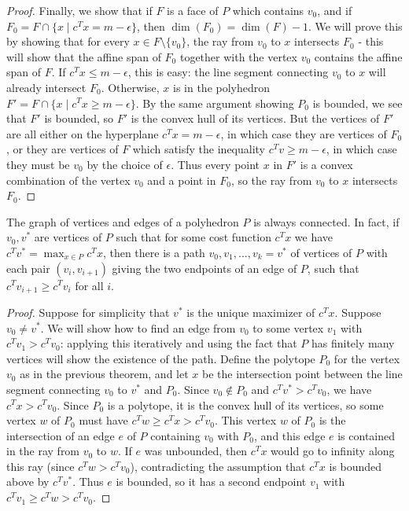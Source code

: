 \documentclass[12pt]{article}
\begin{document}
\begin{proof}
Finally, we show that if $F$ is a face of $P$ which contains $v_0$, and if $F_0 = F \cap \{x \mid c^Tx = m-\epsilon\}$, then $\dim(F_0) = \dim(F) - 1$. We will prove this by showing that for every $x \in F \setminus \{v_0\}$, the ray from $v_0$ to $x$ intersects $F_0$ - this will show that the affine span of $F_0$ together with the vertex $v_0$ contains the affine span of $F$. If $c^Tx \le m-\epsilon$, this is easy: the line segment connecting $v_0$ to $x$ will already intersect $F_0$. Otherwise, $x$ is in the polyhedron $F' = F \cap \{x \mid c^Tx \ge m-\epsilon\}$. By the same argument showing $P_0$ is bounded, we see that $F'$ is bounded, so $F'$ is the convex hull of its vertices. But the vertices of $F'$ are all either on the hyperplane $c^Tx = m-\epsilon$, in which case they are vertices of $F_0$, or they are vertices of $F$ which satisfy the inequality $c^Tv \ge m-\epsilon$, in which case they must be $v_0$ by the choice of $\epsilon$. Thus every point $x$ in $F'$ is a convex combination of the vertex $v_0$ and a point in $F_0$, so the ray from $v_0$ to $x$ intersects $F_0$.
\end{proof}

\begin{corollary} The graph of vertices and edges of a polyhedron $P$ is always connected. In fact, if $v_0, v^*$ are vertices of $P$ such that for some cost function $c^Tx$ we have $c^Tv^* = \max_{x \in P} c^Tx$, then there is a path $v_0, v_1, ..., v_k = v^*$ of vertices of $P$ with each pair $(v_i, v_{i+1})$ giving the two endpoints of an edge of $P$, such that $c^Tv_{i+1} \ge c^Tv_i$ for all $i$.
\end{corollary}
\begin{proof} Suppose for simplicity that $v^*$ is the unique maximizer of $c^Tx$. Suppose $v_0 \ne v^*$. We will show how to find an edge from $v_0$ to some vertex $v_1$ with $c^Tv_1 > c^Tv_0$: applying this iteratively and using the fact that $P$ has finitely many vertices will show the existence of the path. Define the polytope $P_0$ for the vertex $v_0$ as in the previous theorem, and let $x$ be the intersection point between the line segment connecting $v_0$ to $v^*$ and $P_0$. Since $v_0 \not\in P_0$ and $c^Tv^* > c^Tv_0$, we have $c^Tx > c^Tv_0$. Since $P_0$ is a polytope, it is the convex hull of its vertices, so some vertex $w$ of $P_0$ must have $c^Tw \ge c^Tx > c^Tv_0$. This vertex $w$ of $P_0$ is the intersection of an edge $e$ of $P$ containing $v_0$ with $P_0$, and this edge $e$ is contained in the ray from $v_0$ to $w$. If $e$ was unbounded, then $c^Tx$ would go to infinity along this ray (since $c^Tw > c^Tv_0$), contradicting the assumption that $c^Tx$ is bounded above by $c^Tv^*$. Thus $e$ is bounded, so it has a second endpoint $v_1$ with $c^Tv_1 \ge c^Tw > c^Tv_0$.
\end{proof}
\end{document}
